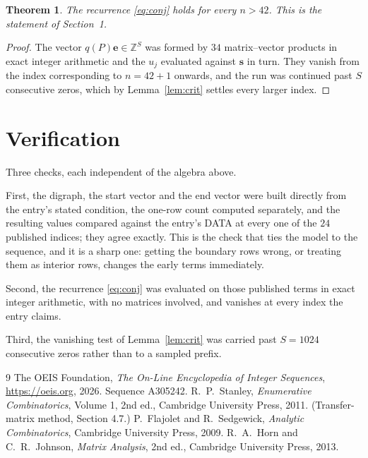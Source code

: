 \documentclass[11pt,a4paper]{article}
\theoremstyle{plain}
\newtheorem{theorem}{Theorem}
\theoremstyle{definition}
\begin{document}
\begin{theorem}
The recurrence \eqref{eq:conj} holds for every $n>42$. This is the statement of
Section~1.
\end{theorem}

\begin{proof}
The vector $q(P)\mathbf{e}\in\mathbb{Z}^{S}$ was formed by $34$ matrix--vector
products in exact integer arithmetic and the $u_j$ evaluated against $\mathbf{s}$ in turn.
They vanish from the index corresponding to $n=42+1$ onwards, and the run was continued
past $S$ consecutive zeros, which by Lemma~\ref{lem:crit} settles every larger index.
\end{proof}

\section{Verification}

Three checks, each independent of the algebra above.

First, the digraph, the start vector and the end vector were built directly from the
entry's stated condition, the one-row count computed separately, and the resulting values
compared against the entry's DATA at every one of the $24$ published indices; they
agree exactly. This is the check that ties the model to the sequence, and it is a sharp one:
getting the boundary rows wrong, or treating them as interior rows, changes the early terms
immediately.

Second, the recurrence \eqref{eq:conj} was evaluated on those published terms in exact
integer arithmetic, with no matrices involved, and vanishes at every index the entry claims.

Third, the vanishing test of Lemma~\ref{lem:crit} was carried past $S=1024$ consecutive
zeros rather than to a sampled prefix.

\begin{thebibliography}{9}
 The OEIS Foundation, \emph{The On-Line Encyclopedia of Integer
Sequences}, \url{https://oeis.org}, 2026. Sequence A305242.
 R.~P.~Stanley, \emph{Enumerative Combinatorics}, Volume 1, 2nd ed.,
Cambridge University Press, 2011. (Transfer-matrix method, Section 4.7.)
 P.~Flajolet and R.~Sedgewick, \emph{Analytic Combinatorics}, Cambridge
University Press, 2009.
 R.~A.~Horn and C.~R.~Johnson, \emph{Matrix Analysis}, 2nd ed., Cambridge
University Press, 2013.
\end{thebibliography}
\end{document}
